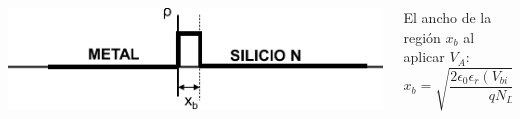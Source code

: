 \documentclass[10pt,t,aspectratio=169]{beamer}
\begin{document}
\begin{frame}[t]
\begin{columns}
        \begin{column}{0.5\textwidth}
        
            \includegraphics[width=\textwidth]{./figures/contacto-MS-7.pdf}
            
        \end{column}
        
        \begin{column}{0.5\textwidth}
        
            El ancho de la región $x_b$ al aplicar $V_A$:
            \[ x_b = \sqrt{\dfrac{2\epsilon_0\epsilon_r(V_{bi}-V_A)}{qN_D}} \]
            
        \end{column}
        
    \end{columns}
    
\end{frame}
\end{document}
